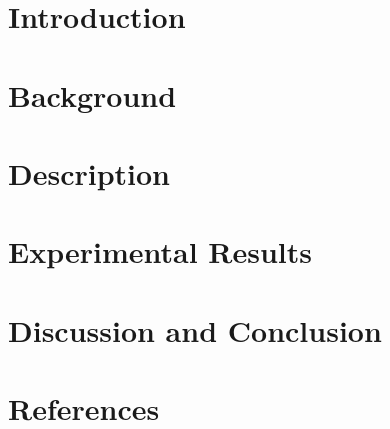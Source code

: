 \documentclass[11pt]{article}
\begin{document}
		\newpage
		\section{Introduction}
		\section{Background}
		\section{Description}
		\section{Experimental Results}
		\section{Discussion and Conclusion}
		\section{References}
		
	
\end{document}
